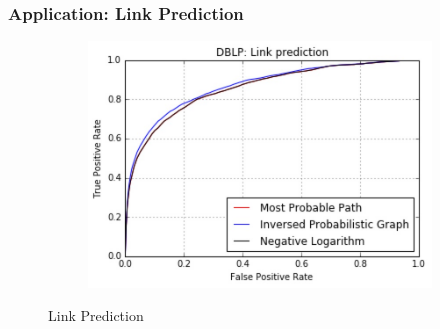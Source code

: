 \documentclass[10pt]{beamer}
\begin{document}
\begin{frame}
\frametitle{Application: Link Prediction}
\vspace{0.15in}
\begin{figure}[H]
\centering
\begin{subfigure}{.9\textwidth}
  \centering
  \includegraphics[width=1\linewidth]{LP.jpeg}
\end{subfigure}

\caption{Link Prediction}
\end{figure}
\end{frame}
\end{document}
